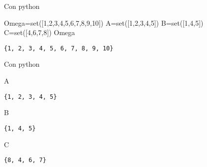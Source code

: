 \documentclass[
  ignorenonframetext,
  aspectratio=169]{beamer}
\newenvironment{Shaded}{\begin{snugshade}}{\end{snugshade}}
\newcommand{\BuiltInTok}[1]{\textcolor[rgb]{0.00,0.23,0.31}{#1}}
\newcommand{\DecValTok}[1]{\textcolor[rgb]{0.68,0.00,0.00}{#1}}
\newcommand{\NormalTok}[1]{\textcolor[rgb]{0.00,0.23,0.31}{#1}}
\newcommand{\OperatorTok}[1]{\textcolor[rgb]{0.37,0.37,0.37}{#1}}
\begin{document}
\begin{frame}[fragile]{Con python}
\protect\hypertarget{con-python}{}
\begin{Shaded}
\begin{Highlighting}[]
\NormalTok{Omega}\OperatorTok{=}\BuiltInTok{set}\NormalTok{([}\DecValTok{1}\NormalTok{,}\DecValTok{2}\NormalTok{,}\DecValTok{3}\NormalTok{,}\DecValTok{4}\NormalTok{,}\DecValTok{5}\NormalTok{,}\DecValTok{6}\NormalTok{,}\DecValTok{7}\NormalTok{,}\DecValTok{8}\NormalTok{,}\DecValTok{9}\NormalTok{,}\DecValTok{10}\NormalTok{])}
\NormalTok{A}\OperatorTok{=}\BuiltInTok{set}\NormalTok{([}\DecValTok{1}\NormalTok{,}\DecValTok{2}\NormalTok{,}\DecValTok{3}\NormalTok{,}\DecValTok{4}\NormalTok{,}\DecValTok{5}\NormalTok{])}
\NormalTok{B}\OperatorTok{=}\BuiltInTok{set}\NormalTok{([}\DecValTok{1}\NormalTok{,}\DecValTok{4}\NormalTok{,}\DecValTok{5}\NormalTok{])}
\NormalTok{C}\OperatorTok{=}\BuiltInTok{set}\NormalTok{([}\DecValTok{4}\NormalTok{,}\DecValTok{6}\NormalTok{,}\DecValTok{7}\NormalTok{,}\DecValTok{8}\NormalTok{])}
\NormalTok{Omega}
\end{Highlighting}
\end{Shaded}

\begin{verbatim}
{1, 2, 3, 4, 5, 6, 7, 8, 9, 10}
\end{verbatim}
\end{frame}

\begin{frame}[fragile]{Con python}
\protect\hypertarget{con-python-1}{}
\begin{Shaded}
\begin{Highlighting}[]
\NormalTok{A}
\end{Highlighting}
\end{Shaded}

\begin{verbatim}
{1, 2, 3, 4, 5}
\end{verbatim}

\begin{Shaded}
\begin{Highlighting}[]
\NormalTok{B}
\end{Highlighting}
\end{Shaded}

\begin{verbatim}
{1, 4, 5}
\end{verbatim}

\begin{Shaded}
\begin{Highlighting}[]
\NormalTok{C}
\end{Highlighting}
\end{Shaded}

\begin{verbatim}
{8, 4, 6, 7}
\end{verbatim}
\end{frame}
\end{document}
